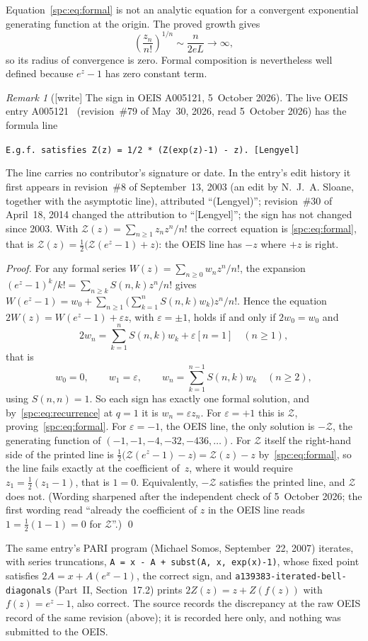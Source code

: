 \documentclass[11pt,letterpaper]{article}
\theoremstyle{definition}\newtheorem{definition}[theorem]{Definition}
\theoremstyle{remark}\newtheorem{remark}[theorem]{Remark}
\newcommand{\file}[1]{\nolinkurl{#1}}
\begin{document}
Equation~\eqref{spc:eq:formal} is not an analytic equation for a convergent exponential generating function at the origin. The proved growth gives
\[
 \left(\frac{z_n}{n!}\right)^{1/n}\sim\frac{n}{2eL}\longrightarrow\infty,
\]
so its radius of convergence is zero. Formal composition is nevertheless well defined because $e^z-1$ has zero constant term.

\begin{remark}[{[write]} The sign in OEIS A005121, 5~October 2026]\label{spc:rem:oeis}
The live OEIS entry A005121~\cite{OEIS} (revision~\#79 of May~30, 2026, read
5~October 2026) has the formula line
\begin{center}
\texttt{E.g.f. satisfies Z(z) = 1/2 * (Z(exp(z)-1) - z). [Lengyel]}
\end{center}
The line carries no contributor's signature or date. In the entry's edit
history it first appears in revision~\#8 of September~13, 2003 (an edit by
N.~J.~A. Sloane, together with the asymptotic line), attributed
``(Lengyel)''; revision~\#30 of April~18, 2014 changed the attribution to
``[Lengyel]''; the sign has not changed since 2003. With
$\mathcal Z(z)=\sum_{n\ge1}z_nz^n/n!$ the correct equation is
\eqref{spc:eq:formal}, that is $\mathcal Z(z)=\tfrac12\bigl(\mathcal
Z(e^z-1)+z\bigr)$: the OEIS line has $-z$ where $+z$ is right.

\emph{Proof.} For any formal series $W(z)=\sum_{n\ge0}w_nz^n/n!$, the
expansion $(e^z-1)^k/k!=\sum_{n\ge k}S(n,k)z^n/n!$ gives
$W(e^z-1)=w_0+\sum_{n\ge1}\bigl(\sum_{k=1}^nS(n,k)w_k\bigr)z^n/n!$. Hence
the equation $2W(z)=W(e^z-1)+\varepsilon z$, with $\varepsilon=\pm1$, holds
if and only if $2w_0=w_0$ and
\[
 2w_n=\sum_{k=1}^{n}S(n,k)w_k+\varepsilon[n=1]\quad(n\ge1),
\]
that is
\[
 w_0=0,\qquad w_1=\varepsilon,\qquad
 w_n=\sum_{k=1}^{n-1}S(n,k)w_k\quad(n\ge2),
\]
using $S(n,n)=1$. So each sign has exactly one formal solution, and
by~\eqref{spc:eq:recurrence} at $q=1$ it is $w_n=\varepsilon z_n$. For
$\varepsilon=+1$ this is $\mathcal Z$, proving~\eqref{spc:eq:formal}. For
$\varepsilon=-1$, the OEIS line, the only solution is $-\mathcal Z$, the
generating function of $(-1,-1,-4,-32,-436,\dots)$. For $\mathcal Z$ itself
the right-hand side of the printed line is
$\tfrac12\bigl(\mathcal Z(e^z-1)-z\bigr)=\mathcal Z(z)-z$
by~\eqref{spc:eq:formal}, so the line fails exactly at the coefficient
of~$z$, where it would require $z_1=\tfrac12(z_1-1)$, that is $1=0$.
Equivalently, $-\mathcal Z$ satisfies the printed line, and $\mathcal Z$ does
not. \textup{(Wording sharpened after the independent check of 5~October
2026; the first wording read ``already the coefficient of $z$ in the OEIS
line reads $1=\tfrac12(1-1)=0$ for $\mathcal Z$''.)}
\qed

The same entry's PARI program (Michael Somos, September~22, 2007) iterates,
with series truncations, \texttt{A = x - A + subst(A, x, exp(x)-1)}, whose fixed point satisfies
$2A=x+A(e^x-1)$, the correct sign, and \file{a139383-iterated-bell-diagonals}
(Part~II, Section~17.2) prints $2Z(z)=z+Z(f(z))$ with $f(z)=e^z-1$, also
correct. The source records the discrepancy at the raw OEIS record of the
same revision (above); it is recorded here only, and nothing was submitted
to the OEIS.
\end{remark}
\end{document}
